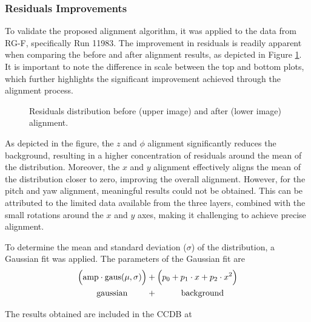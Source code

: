 \subsubsection{Residuals Improvements}
\label{12.22::residuals_improvements}
    To validate the proposed alignment algorithm, it was applied to the data from RG-F, specifically Run 11983.
    The improvement in residuals is readily apparent when comparing the before and after alignment results, as depicted in Figure \ref{fig::12.22::fmt_residuals_comparison}.
    It is important to note the difference in scale between the top and bottom plots, which further highlights the significant improvement achieved through the alignment process.

    \begin{figure}[t!]
        \caption[Residuals distribution improvement.]
        {Residuals distribution before (upper image) and after (lower image) alignment.}
        \label{fig::12.22::fmt_residuals_comparison}
    \end{figure}

    As depicted in the figure, the $z$ and $\phi$ alignment significantly reduces the background, resulting in a higher concentration of residuals around the mean of the distribution.
    Moreover, the $x$ and $y$ alignment effectively aligns the mean of the distribution closer to zero, improving the overall alignment.
    However, for the pitch and yaw alignment, meaningful results could not be obtained.
    This can be attributed to the limited data available from the three layers, combined with the small rotations around the $x$ and $y$ axes, making it challenging to achieve precise alignment.

    To determine the mean and standard deviation ($\sigma$) of the distribution, a Gaussian fit was applied. The parameters of the Gaussian fit are
     \begin{align*}
        \Big( \text{amp} \cdot \text{gaus}(\mu, \sigma) \Big) &+ \Big( p_0 + p_1\cdot x + p_2\cdot x^2 \Big) \\
        \text{gaussian} \hspace{0.8cm} &+ \hspace{1cm} \text{background}
    \end{align*}

    The results obtained are included in the CCDB at

